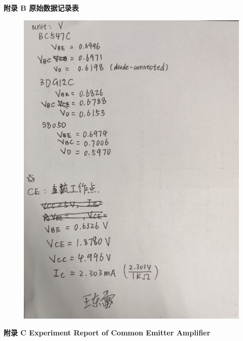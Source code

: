 \documentclass[UTF8]{article}
\begin{document}
\newpage
\begin{center}\Huge{\bfseries 
    附录 B\hspace*{20pt} 原始数据记录表
}\end{center}
\thispagestyle{fancy} 
\begin{figure}[H]\centering
    \includegraphics[width=0.9\columnwidth]{LCE-02-三极管/assets/附录/原始数据.png}
\end{figure}


\newpage
\vspace*{\fill}\begin{center}\Huge{\bfseries 
    附录 C \hspace*{20pt} Experiment Report of Common Emitter Amplifier
}\end{center}\vspace*{\fill}
\thispagestyle{fancy} 

\end{document}
